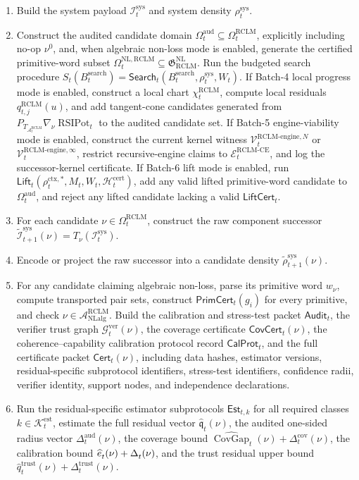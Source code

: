 \documentclass[11pt,a4paper]{article}
\newcommand{\Acal}{\mathcal A}
\newcommand{\Vcal}{\mathcal V}
\newcommand{\Gcal}{\mathcal G}
\newcommand{\RCLM}{\mathrm{RCLM}}
\newcommand{\sys}{\mathrm{sys}}
\newcommand{\ctx}{\mathrm{ctx}}
\newcommand{\aud}{\mathrm{aud}}
\newcommand{\ver}{\mathrm{ver}}
\newcommand{\search}{\mathrm{search}}
\newcommand{\cert}{\mathrm{cert}}
\newcommand{\trust}{\mathrm{trust}}
\newcommand{\cov}{\mathrm{cov}}
\newcommand{\est}{\mathrm{est}}
\newcommand{\engine}{\mathrm{engine}}
\newcommand{\NL}{\mathrm{NL}}
\newcommand{\NLalg}{\mathrm{NLalg}}
\newcommand{\RSIPot}{\operatorname{RSIPot}}
\newcommand{\CE}{\mathrm{CE}}
\begin{document}
\begin{enumerate}[label=\textbf{S\arabic*.}, leftmargin=2em]
    \item Build the system payload \(\mathcal I_t^{\sys}\) and system density \(\rho_t^{\sys}\).
    \item Construct the audited candidate domain \(\Omega_t^{\aud}\subseteq\Omega_t^{\RCLM}\), explicitly including no-op \(\nu^0\), and, when algebraic non-loss mode is enabled, generate the certified primitive-word subset \(\Omega_t^{\NL,\RCLM}\subseteq\mathfrak G_{\RCLM}^{\NL}\). Run the budgeted search procedure \(S_t(B_t^{\search})=\mathsf{Search}_t(B_t^{\search},\rho_t^{\sys},W_t)\).  If Batch-4 local progress mode is enabled, construct a local chart \(\chi_t^{\RCLM}\), compute local residuals \(q_{t,j}^{\RCLM}(u)\), and add tangent-cone candidates generated from \(P_{T_{\Acal_t^{\RCLM}}}\nabla_\nu\RSIPot_t\) to the audited candidate set. If Batch-5 engine-viability mode is enabled, construct the current kernel witness \(\Vcal_t^{\RCLM\text{-}\engine,N}\) or \(\Vcal_t^{\RCLM\text{-}\engine,\infty}\), restrict recursive-engine claims to \(\mathcal E_t^{\RCLM\text{-}\CE}\), and log the successor-kernel certificate. If Batch-6 lift mode is enabled, run \(\mathsf{Lift}_t(\rho_t^{\ctx,*},M_t,W_t,\mathcal H_t^{\cert})\), add any valid lifted primitive-word candidate to \(\Omega_t^{\aud}\), and reject any lifted candidate lacking a valid \(\mathsf{LiftCert}_t\).
    \item For each candidate \(\nu\in\Omega_t^{\RCLM}\), construct the raw component successor \(\widetilde{\mathcal I}_{t+1}^{\sys}(\nu)=T_\nu(\mathcal I_t^{\sys})\).
    \item Encode or project the raw successor into a candidate density \(\widetilde\rho_{t+1}^{\sys}(\nu)\).
    \item For any candidate claiming algebraic non-loss, parse its primitive word \(w_\nu\), compute transported pair sets, construct \(\mathsf{PrimCert}_t(g_i)\) for every primitive, and check \(\nu\in\Acal_{\NLalg}^{\RCLM}\). Build the calibration and stress-test packet \(\mathsf{Audit}_t\), the verifier trust graph \(\Gcal_t^{\ver}(\nu)\), the coverage certificate \(\mathsf{CovCert}_t(\nu)\), the coherence--capability calibration protocol record \(\mathsf{CalProt}_t\), and the full certificate packet \(\mathsf{Cert}_t(\nu)\), including data hashes, estimator versions, residual-specific subprotocol identifiers, stress-test identifiers, confidence radii, verifier identity, support nodes, and independence declarations.
    \item Run the residual-specific estimator subprotocols \(\mathsf{Est}_{t,k}\) for all required classes \(k\in\mathcal K_t^{\est}\), estimate the full residual vector \(\widehat{\mathfrak q}_t(\nu)\), the audited one-sided radius vector \(\Delta_t^{\aud}(\nu)\), the coverage bound \(\widehat{\operatorname{CovGap}}_t(\nu)+\Delta_t^{\cov}(\nu)\), the calibration bound \(\widehat e_t^{\cal}(\nu)+\Delta_t^{\cal}(\nu)\), and the trust residual upper bound \(\widehat q_t^{\trust}(\nu)+\Delta_t^{\trust}(\nu)\).

\end{enumerate}
\end{document}
